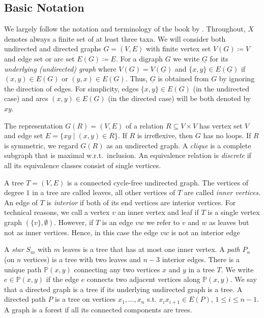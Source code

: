 \documentclass[smallextended]{svjour3}
\newcommand{\rev}[1]{\begingroup\color{blue}#1\endgroup}
\begin{document}
\subsection{Basic Notation} 

We largely follow the notation and terminology of \rev{the book by}
\citet{sem-ste-03a}. Throughout, $X$ denotes always a finite set of at
least three taxa. We will consider both undirected and directed graphs
$G=(V,E)$ with finite vertex set $V(G)\coloneqq V$ and edge set or arc set
$E(G)\coloneqq E$.  For a digraph $G$ we write $\underline{G}$ for its
\emph{underlying (undirected) graph} where $V(G)=V(\underline{G})$ and
$\{x,y\}\in E(\underline{G})$ if $(x,y)\in E(G)$ or $(y,x)\in E(G)$. Thus,
$\underline{G}$ is obtained from $G$ by ignoring the direction of edges.
For simplicity, edges $\{x,y\}\in E(G)$ (in the undirected case) and arcs
$(x,y)\in E(G)$ (in the directed case) will be both denoted by $xy$.

The representation $G(R)=(V,E)$ of a relation $R\subseteq V\times V$ has
vertex set $V$ and edge set $E=\{xy\mid (x,y)\in R\}$. If $R$ is
irreflexive, then $G$ has no loops. If $R$ is symmetric, we regard $G(R)$
as an undirected graph. A \emph{clique} is a complete subgraph that is
maximal w.r.t.\ inclusion. An equivalence relation is \emph{discrete} if
all its equivalence classes consist of single vertices.

A tree $T=(V,E)$ is a connected cycle-free undirected graph.  The vertices
of degree $1$ in a tree are called leaves, all other vertices of $T$ are
called \emph{inner vertices}. 
An edge of $T$ is \emph{interior} if both of
its end vertices are interior vertices. 
\rev{For technical reasons, we call a vertex $v$ an inner vertex and leaf
if $T$ is a single vertex graph
$(\{v\},\emptyset)$. However, if 
$T$ is an edge $vw$ we refer to $v$ and $w$ as leaves but not
as inner vertices. Hence, in this case the edge $vw$ is not an
interior edge}


A \emph{star} $S_m$ with $m$ leaves
is a tree that has at most one inner vertex. A \emph{path} $P_n$ (on $n$
vertices) is a tree with two leaves and $n-3$ interior edges.  There is a
unique path $\mathbb{P}(x,y)$ connecting any two vertices $x$ and $y$ in a
tree $T$. We write $e\in\mathbb{P}(x,y)$ if the edge $e$ connects two
adjacent vertices along $\mathbb{P}(x,y)$.  We say that a directed graph is
a tree if its underlying undirected graph is a tree.  A directed path $P$
is a tree on vertices $x_1,\dots,x_n$ s.t. $x_ix_{i+1}\in E(P)$, $1\leq
i\leq n-1$. A graph is a forest if all its connected components are trees.
\end{document}
